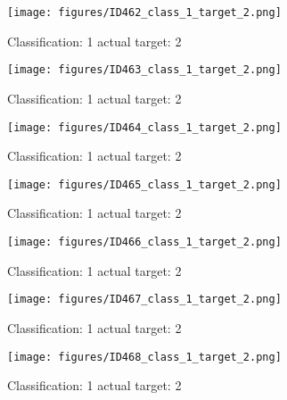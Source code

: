 \begin{figure}[h!]
\begin{center}
\texttt{[image: figures/ID462\_class\_1\_target\_2.png]}
\end{center}
\caption{ Classification: 1 actual target: 2}
\label{fig:ID462_class_1_target_2}
\end{figure}
\begin{figure}[h!]
\begin{center}
\texttt{[image: figures/ID463\_class\_1\_target\_2.png]}
\end{center}
\caption{ Classification: 1 actual target: 2}
\label{fig:ID463_class_1_target_2}
\end{figure}
\begin{figure}[h!]
\begin{center}
\texttt{[image: figures/ID464\_class\_1\_target\_2.png]}
\end{center}
\caption{ Classification: 1 actual target: 2}
\label{fig:ID464_class_1_target_2}
\end{figure}
\begin{figure}[h!]
\begin{center}
\texttt{[image: figures/ID465\_class\_1\_target\_2.png]}
\end{center}
\caption{ Classification: 1 actual target: 2}
\label{fig:ID465_class_1_target_2}
\end{figure}
\begin{figure}[h!]
\begin{center}
\texttt{[image: figures/ID466\_class\_1\_target\_2.png]}
\end{center}
\caption{ Classification: 1 actual target: 2}
\label{fig:ID466_class_1_target_2}
\end{figure}
\begin{figure}[h!]
\begin{center}
\texttt{[image: figures/ID467\_class\_1\_target\_2.png]}
\end{center}
\caption{ Classification: 1 actual target: 2}
\label{fig:ID467_class_1_target_2}
\end{figure}
\begin{figure}[h!]
\begin{center}
\texttt{[image: figures/ID468\_class\_1\_target\_2.png]}
\end{center}
\caption{ Classification: 1 actual target: 2}
\label{fig:ID468_class_1_target_2}
\end{figure}
